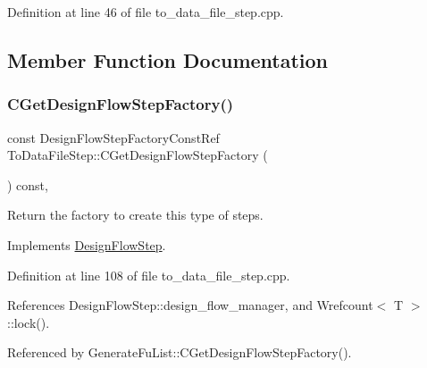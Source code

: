 Definition at line 46 of file to\+\_\+data\+\_\+file\+\_\+step.\+cpp.



\subsection{Member Function Documentation}
\mbox{\label{classToDataFileStep_a2c4090d1f2b890df6a10cc716221c9e9}} 
\subsubsection{\texorpdfstring{C\+Get\+Design\+Flow\+Step\+Factory()}{CGetDesignFlowStepFactory()}}
{\footnotesize\ttfamily const Design\+Flow\+Step\+Factory\+Const\+Ref To\+Data\+File\+Step\+::\+C\+Get\+Design\+Flow\+Step\+Factory (\begin{DoxyParamCaption}{ }\end{DoxyParamCaption}) const\hspace{0.3cm}{\ttfamily [override]}, {\ttfamily [virtual]}}



Return the factory to create this type of steps. 



Implements \hyperlink{classDesignFlowStep_a5510a8d296670a07f6b53312c448994c}{Design\+Flow\+Step}.



Definition at line 108 of file to\+\_\+data\+\_\+file\+\_\+step.\+cpp.



References Design\+Flow\+Step\+::design\+\_\+flow\+\_\+manager, and Wrefcount$<$ T $>$\+::lock().



Referenced by Generate\+Fu\+List\+::\+C\+Get\+Design\+Flow\+Step\+Factory().


